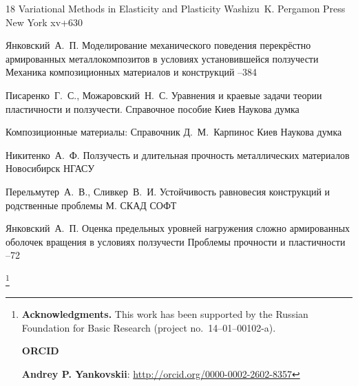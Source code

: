 \begin{thebibliography}{18}
\book Variational Methods in Elasticity and Plasticity
\by Washizu~K.
\publ Pergamon Press
\publaddr New York
\totalpages xv+630


\by Янковский~А.~П.
\paper Моделирование механического поведения перекрёстно армированных металлокомпозитов в условиях установившейся ползучести
\jour Механика композиционных материалов и конструкций
--384


\by Писаренко~Г.~С., Можаровский~Н.~С.
\book Уравнения и краевые задачи теории пластичности и ползучести. Справочное пособие
\publaddr Киев
\publ Наукова думка


\book Композиционные материалы: Справочник
\ed Д.~М.~Карпинос
\publaddr Киев
\publ Наукова думка

\by Никитенко~А.~Ф.
\book Ползучесть и длительная прочность металлических материалов
\publaddr Новосибирск
\publ НГАСУ


\by Перельмутер~А.~В., Сливкер~В.~И.
\book Устойчивость равновесия конструкций и родственные проблемы
\publaddr М.
\publ СКАД СОФТ


\by Янковский~А.~П.
\paper Оценка предельных уровней нагружения сложно армированных оболочек вращения в условиях ползучести 
\jour Проблемы прочности и пластичности
--72

\end{thebibliography}

\RuDate


\newpage




\makeentitle

\thanks{\textbf{Acknowledgments.} This work has been supported by the Russian Foundation for Basic Research (project  no.~14--01--00102-a).


\bigskip

\textbf{ORCID}

\textbf{Andrey P. Yankovskii}: \url{http://orcid.org/0000-0002-2602-8357}


}





\EngRef

